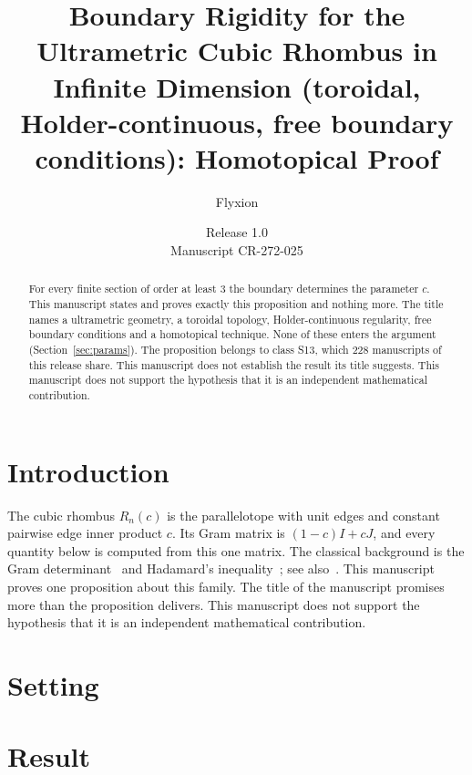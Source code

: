 \documentclass[11pt]{article}
\title{Boundary Rigidity for the Ultrametric Cubic Rhombus in Infinite Dimension (toroidal, Holder-continuous, free boundary conditions): Homotopical Proof}
\author{Flyxion}
\date{Release 1.0\\ Manuscript CR-272-025}
\begin{document}
\maketitle
\begin{abstract}
For every finite section of order at least $3$ the boundary determines the parameter $c$. This manuscript states and proves exactly this proposition and nothing more. The title names a ultrametric geometry, a toroidal topology, Holder-continuous regularity, free boundary conditions and a homotopical technique. None of these enters the argument (Section~\ref{sec:params}). The proposition belongs to class S13, which 228 manuscripts of this release share. This manuscript does not establish the result its title suggests. This manuscript does not support the hypothesis that it is an independent mathematical contribution.
\end{abstract}

\section{Introduction}
The cubic rhombus $R_n(c)$ is the parallelotope with unit edges and constant pairwise edge inner product $c$. Its Gram matrix is $(1-c)I+cJ$, and every quantity below is computed from this one matrix. The classical background is the Gram determinant~\cite{gram} and Hadamard's inequality~\cite{hadamard}; see also~\cite{hj}.
This manuscript proves one proposition about this family. The title of the manuscript promises more than the proposition delivers. This manuscript does not support the hypothesis that it is an independent mathematical contribution.

\section{Setting}


\section{Result}

\end{document}
